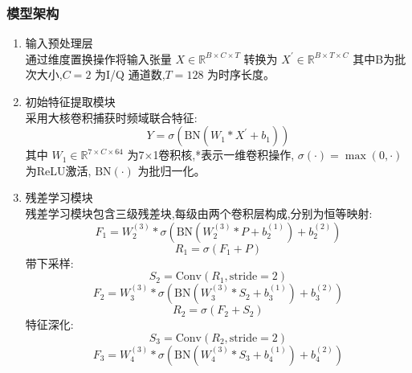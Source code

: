 \documentclass{article}
\begin{document}
\begin{CJK}{UTF8}{gbsn}
\subsubsection{模型架构}
\begin{enumerate}
    \item 输入预处理层 \\
    通过维度置换操作将输入张量 $X\in \mathbb{R}^{B\times C\times T}$ 转换为 $X^{\prime}\in\mathbb{R}^{B\times T\times C}$ 其中B为批次大小,$C=2$ 为I/Q 通道数,$T=128$ 为时序长度。
    \item 初始特征提取模块 \\
    采用大核卷积捕获时频域联合特征:
    \begin{equation}
        Y=\sigma(\text{BN}(W_{1}*X^{\prime}+b_{1}))
        \label{eq:initial_feature}
    \end{equation}
    其中 $W_{1}\in\mathbb{R}^{7\times C\times64}$ 为7$\times$1卷积核,*表示一维卷积操作, $\sigma(\cdot)=\max(0,\cdot)$ 为ReLU激活, $\text{BN}(\cdot)$ 为批归一化。
    \item 残差学习模块 \\
    残差学习模块包含三级残差块,每级由两个卷积层构成,分别为恒等映射:
    \begin{equation}
        F_{1}=W_{2}^{(3)}*\sigma(\text{BN}(W_{2}^{(3)}*P+b_{2}^{(1)})+b_{2}^{(2)})
        \label{eq:residual_identity1}
    \end{equation}
    \begin{equation}
        R_{1}=\sigma(F_{1}+P)
        \label{eq:residual_identity2}
    \end{equation}
    带下采样:
    \begin{equation}
        S_{2}=\text{Conv}(R_{1},\text{stride}=2)
        \label{eq:downsample1}
    \end{equation}
    \begin{equation}
        F_{2}=W_{3}^{(3)}*\sigma(\text{BN}(W_{3}^{(3)}*S_{2}+b_{3}^{(1)})+b_{3}^{(2)})
        \label{eq:residual_downsample1}
    \end{equation}
    \begin{equation}
        R_{2}=\sigma(F_{2}+S_{2})
        \label{eq:residual_downsample2}
    \end{equation}
    特征深化:
    \begin{equation}
        S_{3}=\text{Conv}(R_{2},\text{stride}=2)
        \label{eq:downsample2}
    \end{equation}
    \begin{equation}
        F_{3}=W_{4}^{(3)}*\sigma(\text{BN}(W_{4}^{(3)}*S_{3}+b_{4}^{(1)})+b_{4}^{(2)})

\end{equation}
\end{enumerate}
\end{CJK}
\end{document}
